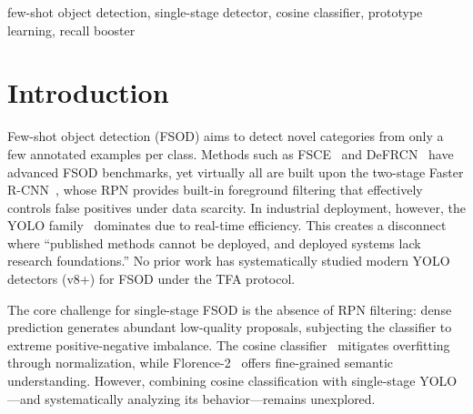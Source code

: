 \documentclass[conference]{IEEEtran}
\begin{document}
\begin{abstract}
Few-shot object detection (FSOD) remains predominantly built upon two-stage architectures such as Faster R-CNN, while YOLO-series single-stage detectors---dominant in industrial deployment---lack systematic FSOD investigation. We present VCP (Visual-Cosine-Prototype), combining YOLO11s with a cosine classifier and prototype learning under the TFA protocol. On PASCAL VOC, VCP achieves 72.2\% mAP50 (3-split mean) at 10-shot with only 9.5M parameters ($\sim$1/6 of competing methods), yet underperforms standard fine-tuning on MS COCO. Through P-R decomposition across 24 comparison groups, we reveal that the cosine classifier acts as a \textit{Recall Booster}, consistently shifting predictions toward higher recall at the expense of precision. We formulate the P-R Tradeoff Hypothesis: net benefit depends on baseline recall headroom and the dataset-specific P-R tradeoff ratio, explaining the VOC-COCO divergence. We also explore Florence-2 semantic descriptions as a lightweight auxiliary prior (+0.5 pp, zero VLM inference overhead). VCP runs at 54.4 FPS, 4--5$\times$ faster than two-stage FSOD methods.
\end{abstract}

\begin{IEEEkeywords}
few-shot object detection, single-stage detector, cosine classifier, prototype learning, recall booster
\end{IEEEkeywords}

\section{Introduction}

Few-shot object detection (FSOD) aims to detect novel categories from only a few annotated examples per class. Methods such as FSCE~\cite{sun2021fsce} and DeFRCN~\cite{qiao2021defrcn} have advanced FSOD benchmarks, yet virtually all are built upon the two-stage Faster R-CNN~\cite{ren2015faster}, whose RPN provides built-in foreground filtering that effectively controls false positives under data scarcity. In industrial deployment, however, the YOLO family~\cite{terven2023yolo,jocher2023ultralytics} dominates due to real-time efficiency. This creates a disconnect where ``published methods cannot be deployed, and deployed systems lack research foundations.'' No prior work has systematically studied modern YOLO detectors (v8+) for FSOD under the TFA protocol.

The core challenge for single-stage FSOD is the absence of RPN filtering: dense prediction generates abundant low-quality proposals, subjecting the classifier to extreme positive-negative imbalance. The cosine classifier~\cite{wang2020tfa} mitigates overfitting through normalization, while Florence-2~\cite{xiao2024florence2} offers fine-grained semantic understanding. However, combining cosine classification with single-stage YOLO---and systematically analyzing its behavior---remains unexplored.
\end{document}
